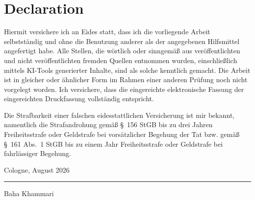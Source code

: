 \documentclass[12pt,a4paper]{article}
\numberwithin{equation}{section}
\begin{document}
\newpage
\section*{Declaration}

Hiermit versichere ich an Eides statt, dass ich die vorliegende Arbeit selbstst\"andig und ohne die Benutzung anderer als der angegebenen Hilfsmittel angefertigt habe. Alle Stellen, die w\"ortlich oder sinngem\"a\ss{} aus ver\"offentlichten und nicht ver\"offentlichten fremden Quellen entnommen wurden, einschlie\ss{}lich mittels KI-Tools generierter Inhalte, sind als solche kenntlich gemacht. Die Arbeit ist in gleicher oder \"ahnlicher Form im Rahmen einer anderen Pr\"ufung noch nicht vorgelegt worden. Ich versichere, dass die eingereichte elektronische Fassung der eingereichten Druckfassung vollst\"andig entspricht.

Die Strafbarkeit einer falschen eidesstattlichen Versicherung ist mir bekannt, namentlich die Strafandrohung gem\"a\ss{} \S~156 StGB bis zu drei Jahren Freiheitsstrafe oder Geldstrafe bei vors\"atzlicher Begehung der Tat bzw. gem\"a\ss{} \S~161 Abs.~1 StGB bis zu einem Jahr Freiheitsstrafe oder Geldstrafe bei fahrl\"assiger Begehung.

\vspace{2.5cm}

\noindent
Cologne, August 2026 \hfill \rule{6cm}{0.4pt}

\noindent
\mbox{} \hfill Baha Khammari
\end{document}
